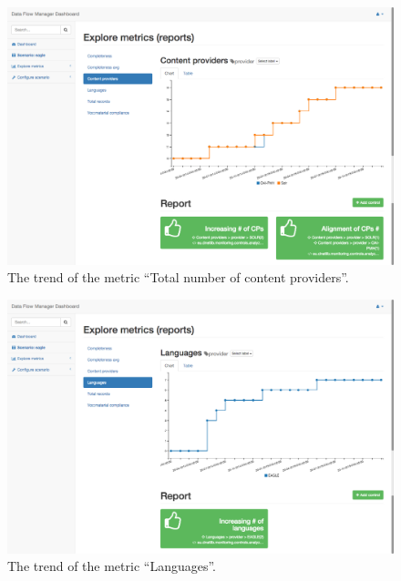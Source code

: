 \documentclass[amsthm,ebook]{saparticle}
\begin{document}
\begin{figure}[H]
\centering
\includegraphics[width=\textwidth]{img/cps.png}
\caption{The trend of the metric ``Total number of content providers''.}
\label{fig:cps}
\end{figure}

\begin{figure}[H]
\centering
\includegraphics[width=\textwidth]{img/lang.png}
\caption{The trend of the metric ``Languages''.}
\label{fig:lang}
\end{figure}
\end{document}

